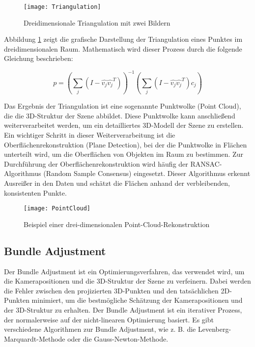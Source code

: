 \begin{figure}
    \centering
    \texttt{[image: Triangulation]}
    \caption{Dreidimensionale Triangulation mit zwei Bildern\label{fig:Triangulation}}\par
\end{figure}

Abbildung \ref{fig:Triangulation} zeigt die grafische Darstellung der Triangulation eines Punktes im dreidimensionalen Raum. Mathematisch wird dieser Prozess durch die folgende Gleichung beschrieben:

\[
p = \left( \sum_j \left( I - \hat{v_j} \hat{v_j}^T \right) \right)^{-1} \left( \sum_j \left( I - \hat{v_j} \hat{v_j}^T \right) c_j \right)
\]

Das Ergebnis der Triangulation ist eine sogenannte Punktwolke (Point Cloud), die die 3D-Struktur der Szene abbildet. Diese Punktwolke kann anschließend weiterverarbeitet werden, um ein detailliertes 3D-Modell der Szene zu erstellen. Ein wichtiger Schritt in dieser Weiterverarbeitung ist die Oberflächenrekonstruktion (Plane Detection), bei der die Punktwolke in Flächen unterteilt wird, um die Oberflächen von Objekten im Raum zu bestimmen. Zur Durchführung der Oberflächenrekonstruktion wird häufig der RANSAC-Algorithmus (Random Sample Consensus) eingesetzt. Dieser Algorithmus erkennt Ausreißer in den Daten und schätzt die Flächen anhand der verbleibenden, konsistenten Punkte.

\begin{figure}
    \centering
    \texttt{[image: PointCloud]}
    \caption{Beispiel einer drei-dimensionalen Point-Cloud-Rekonstruktion\label{fig:PointCloud}}\par
\end{figure}

\subsection{Bundle Adjustment}

Der Bundle Adjustment ist ein Optimierungsverfahren, das verwendet wird, um die Kamerapositionen und die 3D-Struktur der Szene zu verfeinern. Dabei werden die Fehler zwischen den projizierten 3D-Punkten und den tatsächlichen 2D-Punkten minimiert, um die bestmögliche Schätzung der Kamerapositionen und der 3D-Struktur zu erhalten. Der Bundle Adjustment ist ein iterativer Prozess, der normalerweise auf der nicht-linearen Optimierung basiert. Es gibt verschiedene Algorithmen zur Bundle Adjustment, wie z. B. die Levenberg-Marquardt-Methode oder die Gauss-Newton-Methode.

